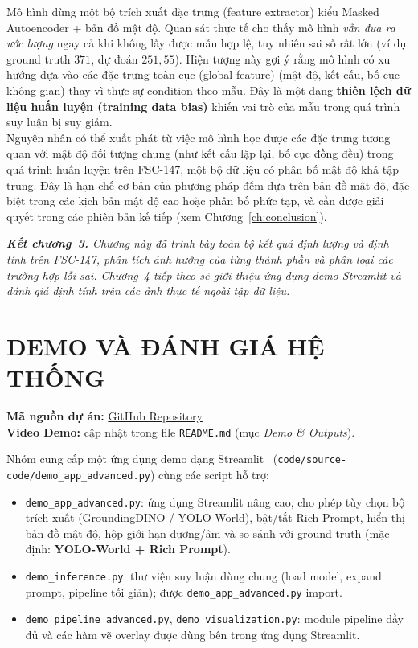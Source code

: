 \documentclass[a4paper,12pt]{report}
\numberwithin{figure}{chapter}
\numberwithin{table}{chapter}
\begin{document}
Mô hình dùng một bộ trích xuất đặc trưng (feature extractor) kiểu Masked Autoencoder + bản đồ mật độ. Quan sát thực tế cho thấy mô hình \emph{vẫn đưa ra ước lượng} ngay cả khi không lấy được mẫu hợp lệ, tuy nhiên sai số rất lớn (ví dụ ground truth $371$, dự đoán $251{,}55$). Hiện tượng này gợi ý rằng mô hình có xu hướng dựa vào các đặc trưng toàn cục (global feature) (mật độ, kết cấu, bố cục không gian) thay vì thực sự condition theo mẫu. Đây là một dạng \textbf{thiên lệch dữ liệu huấn luyện (training data bias)} khiến vai trò của mẫu trong quá trình suy luận bị suy giảm.\\[1em]
Nguyên nhân có thể xuất phát từ việc mô hình học được các đặc trưng tương quan với mật độ đối tượng chung (như kết cấu lặp lại, bố cục đồng đều) trong quá trình huấn luyện trên FSC-147, một bộ dữ liệu có phân bố mật độ khá tập trung. Đây là hạn chế cơ bản của phương pháp đếm dựa trên bản đồ mật độ, đặc biệt trong các kịch bản mật độ cao hoặc phân bố phức tạp, và cần được giải quyết trong các phiên bản kế tiếp (xem Chương~\ref{ch:conclusion}).

\bigskip
\noindent\textit{\textbf{Kết chương~3.} Chương này đã trình bày toàn bộ kết quả định lượng và định tính trên FSC-147, phân tích ảnh hưởng của từng thành phần và phân loại các trường hợp lỗi sai. Chương~4 tiếp theo sẽ giới thiệu ứng dụng demo Streamlit và đánh giá định tính trên các ảnh thực tế ngoài tập dữ liệu.}

\chapter{DEMO VÀ ĐÁNH GIÁ HỆ THỐNG}
\label{ch:demo}

\begin{flushleft}
    \textbf{Mã nguồn dự án:} \href{https://github.com/paht2005/CS338.Q21_Zero-shot-Object-Coutning-with-Good-Examplers}{GitHub Repository} \\
    \textbf{Video Demo:} cập nhật trong file \texttt{README.md} (mục \emph{Demo \& Outputs}).
\end{flushleft}
Nhóm cung cấp một ứng dụng demo dạng Streamlit~\cite{streamlit} (\texttt{code/source-code/demo\_app\_advanced.py}) cùng các script hỗ trợ:

\begin{itemize}
    \item \texttt{demo\_app\_advanced.py}: ứng dụng Streamlit nâng cao, cho phép tùy chọn bộ trích xuất (GroundingDINO / YOLO-World), bật/tắt Rich Prompt, hiển thị bản đồ mật độ, hộp giới hạn dương/âm và so sánh với ground-truth (mặc định: \textbf{YOLO-World + Rich Prompt}).
    \item \texttt{demo\_inference.py}: thư viện suy luận dùng chung (load model, expand prompt, pipeline tối giản); được \texttt{demo\_app\_advanced.py} import.
    \item \texttt{demo\_pipeline\_advanced.py}, \texttt{demo\_visualization.py}: module pipeline đầy đủ và các hàm vẽ overlay được dùng bên trong ứng dụng Streamlit.
\end{itemize}
\end{document}
